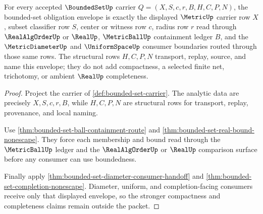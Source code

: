 \begin{theorem}
\label{thm:bounded-set-closure-obligation-envelope}
For every accepted $\BoundedSetUp$ carrier $Q=(X,S,c,r,B,H,C,P,N)$, the bounded-set obligation envelope is exactly the displayed $\MetricUp$ carrier row $X$, subset classifier row $S$, center or witness row $c$, radius row $r$ read through $\RealAlgOrderUp$ or $\RealUp$, $\MetricBallUp$ containment ledger $B$, and the $\MetricDiameterUp$ and $\UniformSpaceUp$ consumer boundaries routed through those same rows. The structural rows $H,C,P,N$ transport, replay, source, and name this envelope; they do not add compactness, a selected finite net, trichotomy, or ambient $\RealUp$ completeness.
\end{theorem}
\begin{proof}
Project the carrier of \autoref{def:bounded-set-carrier}. The analytic data are precisely $X,S,c,r,B$, while $H,C,P,N$ are structural rows for transport, replay, provenance, and local naming.

Use \autoref{thm:bounded-set-ball-containment-route} and \autoref{thm:bounded-set-real-bound-nonescape}. They force each membership and bound read through the $\MetricBallUp$ ledger and the $\RealAlgOrderUp$ or $\RealUp$ comparison surface before any consumer can use boundedness.

Finally apply \autoref{thm:bounded-set-diameter-consumer-handoff} and \autoref{thm:bounded-set-completion-nonescape}. Diameter, uniform, and completion-facing consumers receive only that displayed envelope, so the stronger compactness and completeness claims remain outside the packet.
\end{proof}


